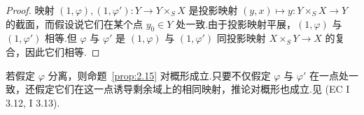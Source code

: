 \begin{proof}
映射 $(1, \varphi), (1, \varphi') \colon Y \to Y \times_{S} X$ 是投影映射 $(y, x) \mapsto y \colon Y \times_{S} X \to Y$ 的截面，而假设说它们在某个点 $y_0 \in Y$ 处一致.由于投影映射平展，$(1, \varphi)$ 与 $(1, \varphi')$ 相等.但 $\varphi$ 与 $\varphi'$ 是 $(1, \varphi)$ 与 $(1, \varphi')$ 同投影映射 $X \times_{S} Y \to X$ 的复合，因此它们相等.
\end{proof}

\begin{remark}\label{rem:2.17}
若假定 $\varphi$ 分离，则命题~\ref{prop:2.15} 对概形成立.只要不仅假定 $\varphi$ 与 $\varphi'$ 在一点处一致，还假定它们在这一点诱导剩余域上的相同映射，推论对概形也成立.见 (EC I 3.12, I 3.13).
\end{remark}
